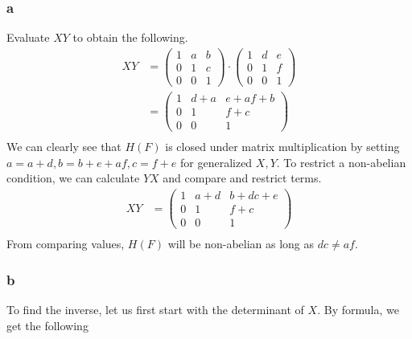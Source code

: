 \documentclass[11 pt]{article}
\theoremstyle{definition}
\theoremstyle{remark}
\begin{document}
\subsubsection*{a}
Evaluate $XY$ to obtain the following.
\begin{align*}
XY &= \begin{pmatrix}
1 & a & b\\
0 & 1 & c\\
0 & 0 & 1
\end{pmatrix} \cdot \begin{pmatrix}
1 & d & e\\
0 & 1 & f\\
0 & 0 & 1
\end{pmatrix} \\
&= 
\begin{pmatrix}
1 & d+a & e+af+b\\
0 & 1 & f+c\\
0 & 0 & 1
\end{pmatrix}
\\
\end{align*}
We can clearly see that $H(F)$ is closed under matrix multiplication by setting $a = a+d, b = b+e+af, c = f+e$ for generalized $X,Y$. To restrict a non-abelian condition, we can calculate $YX$ and compare and restrict terms. 
\begin{align*}
XY &= 
\begin{pmatrix}
1 & a+d & b+dc+e\\
0 & 1 & f+c\\
0 & 0 & 1
\end{pmatrix}
\\
\end{align*}
From comparing values, $H(F)$ will be non-abelian as long as $dc \neq af$.

\subsubsection*{b}

To find the inverse, let us first start with the determinant of $X$. By formula, we get the following
\end{document}
